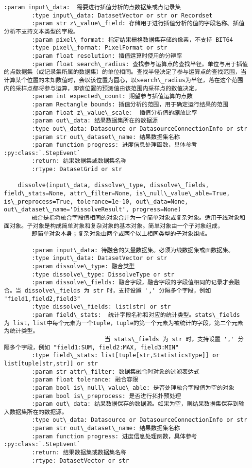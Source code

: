 \documentclass[11pt]{article}
\begin{document}
\begin{Verbatim}[commandchars=\\\{\}]
        :param input\_data:  需要进行插值分析的点数据集或点记录集
        :type input\_data: DatasetVector or str or Recordset
        :param str z\_value\_field: 存储用于进行插值分析的值的字段名称。插值分析不支持文本类型的字段。
        :param pixel\_format: 指定结果栅格数据集存储的像素，不支持 BIT64
        :type pixel\_format: PixelFormat or str
        :param float resolution: 插值运算时使用的分辨率
        :param float search\_radius: 查找参与运算点的查找半径。单位与用于插值的点数据集（或记录集所属的数据集）的单位相同。查找半径决定了参与运算点的查找范围，当计算某个位置的未知数值时，会以该位置为圆心，以search\_radius为半径，落在这个范围内的采样点都将参与运算，即该位置的预测值由该范围内采样点的数值决定。
        :param int expected\_count: 期望参与插值运算的点数
        :param Rectangle bounds: 插值分析的范围，用于确定运行结果的范围
        :param float z\_value\_scale:  插值分析值的缩放比率
        :param out\_data: 结果数据集所在的数据源
        :type out\_data: Datasource or DatasourceConnectionInfo or str
        :param str out\_dataset\_name: 结果数据集名称
        :param function progress: 进度信息处理函数，具体参考 :py:class:`.StepEvent`
        :return: 结果数据集或数据集名称
        :rtype: DatasetGrid or str
    
    dissolve(input\_data, dissolve\_type, dissolve\_fields, field\_stats=None, attr\_filter=None, is\_null\_value\_able=True, is\_preprocess=True, tolerance=1e-10, out\_data=None, out\_dataset\_name='DissolveResult', progress=None)
        融合是指将融合字段值相同的对象合并为一个简单对象或复杂对象。适用于线对象和面对象。子对象是构成简单对象和复杂对象的基本对象。简单对象由一个子对象组成，
        即简单对象本身；复杂对象由两个或两个以上相同类型的子对象组成。
        
        :param input\_data: 待融合的矢量数据集。必须为线数据集或面数据集。
        :type input\_data: DatasetVector or str
        :param dissolve\_type: 融合类型
        :type dissolve\_type: DissolveType or str
        :param dissolve\_fields: 融合字段，融合字段的字段值相同的记录才会融合。当 dissolve\_fields 为 str 时，支持设置 ',' 分隔多个字段，例如 "field1,field2,field3"
        :type dissolve\_fields: list[str] or str
        :param field\_stats:  统计字段名称和对应的统计类型。stats\_fields 为 list，list中每个元素为一个tuple，tuple的第一个元素为被统计的字段，第二个元素为统计类型。
                             当 stats\_fields 为 str 时，支持设置 ',' 分隔多个字段，例如 "field1:SUM, field2:MAX, field3:MIN"
        :type field\_stats: list[tuple[str,StatisticsType]] or list[tuple[str,str]] or str
        :param str attr\_filter: 数据集融合时对象的过滤表达式
        :param float tolerance: 融合容限
        :param bool is\_null\_value\_able: 是否处理融合字段值为空的对象
        :param bool is\_preprocess: 是否进行拓扑预处理
        :param out\_data: 结果数据保存的数据源。如果为空，则结果数据集保存到输入数据集所在的数据源。
        :type out\_data: Datasource or DatasourceConnectionInfo or str
        :param str out\_dataset\_name: 结果数据集名称
        :param function progress: 进度信息处理函数，具体参考 :py:class:`.StepEvent`
        :return: 结果数据集或数据集名称
        :rtype: DatasetVector or str
        

\end{Verbatim}
\end{document}
